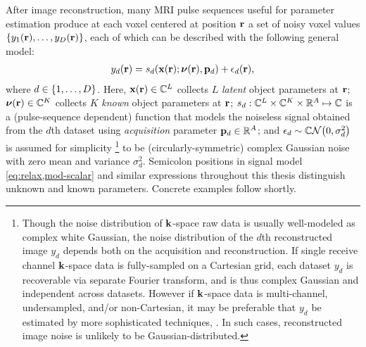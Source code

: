 After image reconstruction,
many MRI pulse sequences
useful for parameter estimation
produce at each voxel 
centered at position $\mathbf{r}$
a set of noisy voxel values 
$\set{y_1\pr,\dots,y_D\pr}$, 
each of which can be described
with the following general model:
\begin{align}
	y_d\pr = s_d\paren{\bmx\pr; \bmnu\pr, \bmp_d} + \epsilon_d\pr,
	\label{eq:relax,mod-scalar}
\end{align}
where 
$d \in \set{1,\dots,D}$. 
Here,
$\bmx\pr \in \complexes{L}$ 
collects $L$ \emph{latent} object parameters at $\mathbf{r}$;
$\bmnu\pr \in \complexes{K}$ 
collects $K$ \emph{known} object parameters at $\mathbf{r}$;
$s_d : \mathbb{C}^{L} \times \mathbb{C}^{K} \times \mathbb{R}^{A} \mapsto \mathbb{C}$
is a (pulse-sequence dependent) function
that models the noiseless signal 
obtained from the $d$th dataset
using \emph{acquisition} parameter $\mathbf{p}_d \in \mathbb{R}^{A}$;
and $\epsilon_d \sim \cgauss{0}{\sigma_d^2}$ 
is assumed for simplicity 
\footnote{%
	Though the noise distribution 
	of $\mathbf{k}$-space raw data 
	is usually well-modeled
	as complex white Gaussian, 
	the noise distribution 
	of the $d$th reconstructed image $y_d$ depends both
	on the acquisition and reconstruction.
	If single receive channel $\mathbf{k}$-space data
	is fully-sampled
	on a Cartesian grid,
	each dataset $y_d$ is recoverable
	via separate Fourier transform,
	and is thus complex Gaussian
	and independent across datasets.
	However if $\mathbf{k}$-space data
	is multi-channel, undersampled, and/or non-Cartesian,
	it may be preferable
	that $y_d$ be estimated by more sophisticated techniques,
	\eg \cite{fessler:03:nff, muckley:15:fpm}.
	In such cases,
	reconstructed image noise is unlikely
	to be Gaussian-distributed.
}
to be (circularly-symmetric) complex Gaussian noise
\cite{macovski:96:nim, lei:07:som}
with zero mean and variance $\sigma_d^2$.
Semicolon positions 
in signal model \eqref{eq:relax,mod-scalar} 
and similar expressions throughout this thesis 
distinguish unknown and known parameters.
Concrete examples follow shortly.


